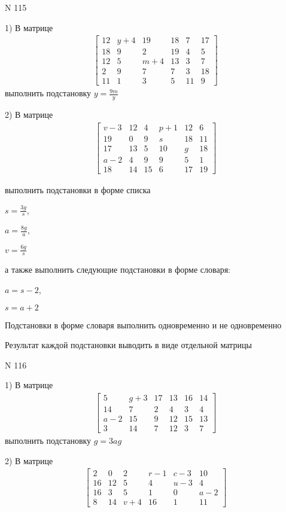 \documentclass[11pt]{report}
\begin{document}
\newpage
N 115


    1) В матрице
\begin{align*}
\left[\begin{matrix}12 & y + 4 & 19 & 18 & 7 & 17\\18 & 9 & 2 & 19 & 4 & 5\\12 & 5 & m + 4 & 13 & 3 & 7\\2 & 9 & 7 & 7 & 3 & 18\\11 & 1 & 3 & 5 & 11 & 9\end{matrix}\right]
\end{align*}
выполнить подстановку $y=\frac{9 m}{y}$


    2) В матрице
\begin{align*}
\left[\begin{matrix}v - 3 & 12 & 4 & p + 1 & 12 & 6\\19 & 0 & 9 & s & 18 & 11\\17 & 13 & 5 & 10 & g & 18\\a - 2 & 4 & 9 & 9 & 5 & 1\\18 & 14 & 15 & 6 & 17 & 19\end{matrix}\right]
\end{align*}

выполнить подстановки в форме списка

$s=\frac{3 g}{s}$,

$a=\frac{8 g}{a}$,

$v=\frac{6 g}{s}$

а также выполнить следующие подстановки в форме словаря:

$a=s - 2$,

$s=a + 2$


    Подстановки в форме словаря выполнить одновременно и не одновременно


    Результат каждой подстановки выводить в виде отдельной матрицы

\newpage
N 116


    1) В матрице
\begin{align*}
\left[\begin{matrix}5 & g + 3 & 17 & 13 & 16 & 14\\14 & 7 & 2 & 4 & 3 & 4\\a - 2 & 15 & 9 & 12 & 15 & 13\\3 & 14 & 7 & 12 & 3 & 7\end{matrix}\right]
\end{align*}
выполнить подстановку $g=3 a g$


    2) В матрице
\begin{align*}
\left[\begin{matrix}2 & 0 & 2 & r - 1 & c - 3 & 10\\16 & 12 & 5 & 4 & u - 3 & 4\\16 & 3 & 5 & 1 & 0 & a - 2\\8 & 14 & v + 4 & 16 & 1 & 11\end{matrix}\right]
\end{align*}
\end{document}

